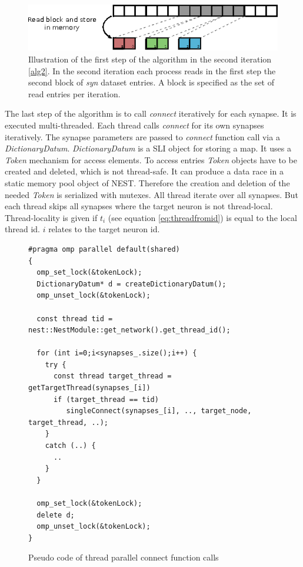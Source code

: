 \begin{figure}[ht!]
\centering
\includegraphics[scale=2.0]{pictures/import_syn_vis_second_it.eps}
\caption{Illustration of the first step of the algorithm in the second iteration \ref{alg2}.
In the second iteration each process reads in the first step the second block of \emph{syn} dataset entries.
A block is specified as the set of read entries per iteration.}
\label{fig:importsynvis2nd}
\end{figure}
\newpage
The last step of the algorithm is to call \emph{connect} iteratively for each synapse.
It is executed multi-threaded.
Each thread calls \emph{connect} for its own synapses iteratively.
The synapse parameters are passed to \emph{connect} function call via a \emph{DictionaryDatum}.
\emph{DictionaryDatum} is a SLI object for storing a map.
It uses a \emph{Token} mechanism for access elements.
To access entries \emph{Token} objects have to be created and deleted,
which is not thread-safe. It can produce a data race in a static memory pool object of NEST.
Therefore the creation and deletion of the needed \emph{Token} is serialized with mutexes.
All thread iterate over all synapses.
But each thread skips all synapses where the target neuron is not thread-local.
Thread-locality is given if $t_i$ (see equation \ref{eq:threadfromid}) is equal to the local thread id.
$i$ relates to the target neuron id.
\begin{figure}[ht!]
\begin{lstlisting}[style=cppcode]
#pragma omp parallel default(shared)
{ 
  omp_set_lock(&tokenLock);
  DictionaryDatum* d = createDictionaryDatum();  
  omp_unset_lock(&tokenLock);

  const thread tid = nest::NestModule::get_network().get_thread_id();
      
  for (int i=0;i<synapses_.size();i++) {
    try {
      const thread target_thread = getTargetThread(synapses_[i])
      if (target_thread == tid)
	     singleConnect(synapses_[i], .., target_node, target_thread, ..);
    }
    catch (..) {
      ..
    }
  }
  
  omp_set_lock(&tokenLock);
  delete d;  
  omp_unset_lock(&tokenLock);
}
\end{lstlisting}
\caption{Pseudo code of thread parallel connect function calls}
\end{figure}
